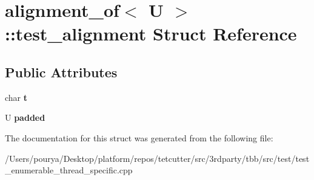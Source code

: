 \hypertarget{structalignment__of_1_1test__alignment}{}\section{alignment\+\_\+of$<$ U $>$\+:\+:test\+\_\+alignment Struct Reference}
\label{structalignment__of_1_1test__alignment}
\subsection*{Public Attributes}
\begin{DoxyCompactItemize}
\item 
\hypertarget{structalignment__of_1_1test__alignment_afe980ad23b6d12b3ea0d880b74155b77}{}char {\bfseries t}\label{structalignment__of_1_1test__alignment_afe980ad23b6d12b3ea0d880b74155b77}

\item 
\hypertarget{structalignment__of_1_1test__alignment_ac34b8d2e7d4e513c5020a27f05e236e4}{}U {\bfseries padded}\label{structalignment__of_1_1test__alignment_ac34b8d2e7d4e513c5020a27f05e236e4}

\end{DoxyCompactItemize}


The documentation for this struct was generated from the following file\+:\begin{DoxyCompactItemize}
\item 
/\+Users/pourya/\+Desktop/platform/repos/tetcutter/src/3rdparty/tbb/src/test/test\+\_\+enumerable\+\_\+thread\+\_\+specific.\+cpp\end{DoxyCompactItemize}
